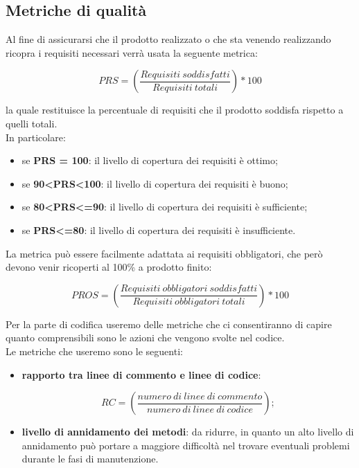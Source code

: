 \subsection{Metriche di qualità}
Al fine di assicurarsi che il prodotto realizzato o che sta venendo realizzando ricopra i requisiti necessari verrà usata la seguente metrica:
\begin{center}
\begin{equation}
\textit{PRS} = (\frac{Requisiti\ soddisfatti}{Requisiti\ totali})*100
\end{equation}
\end{center}

la quale restituisce la percentuale di requisiti che il prodotto soddisfa rispetto a quelli totali.\\ 
In particolare:
\begin{itemize}
\item se \textbf{PRS = 100}: il livello di copertura dei requisiti è ottimo;
\item se \textbf{90<PRS<100}: il livello di copertura dei requisiti è buono;
\item se \textbf{80<PRS<=90}: il livello di copertura dei requisiti è sufficiente;
\item se \textbf{PRS<=80}: il livello di copertura dei requisiti è insufficiente.
\end{itemize}

La metrica può essere facilmente adattata ai requisiti obbligatori, che però devono venir ricoperti al 100\% a prodotto finito:
\begin{center}
\begin{equation}
\textit{PROS} =  (\frac{Requisiti\ obbligatori\ soddisfatti}{Requisiti\ obbligatori\ totali})*100
\end{equation}
\end{center}

Per la parte di codifica useremo delle metriche che ci consentiranno di capire quanto comprensibili sono le azioni che vengono svolte nel codice.\\
Le metriche che useremo sono le seguenti:
\begin{itemize}
\item \textbf{rapporto tra linee di commento e linee di codice}:
\begin{center}
\begin{equation}
\textit{RC} =  (\frac{numero\ di\ linee\ di\ commento}{numero\ di\ linee\ di\ codice});
\end{equation}
\end{center}
\item \textbf{livello di annidamento dei metodi}: da ridurre, in quanto un alto livello di annidamento può portare a maggiore difficoltà nel trovare eventuali problemi durante le fasi di manutenzione.
\end{itemize}
